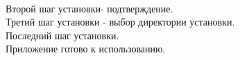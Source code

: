 \\
Второй шаг установки- подтверждение.
\\
Третий шаг установки - выбор директории установки.
\\
Последний шаг установки.\\
Приложение готово к использованию.
